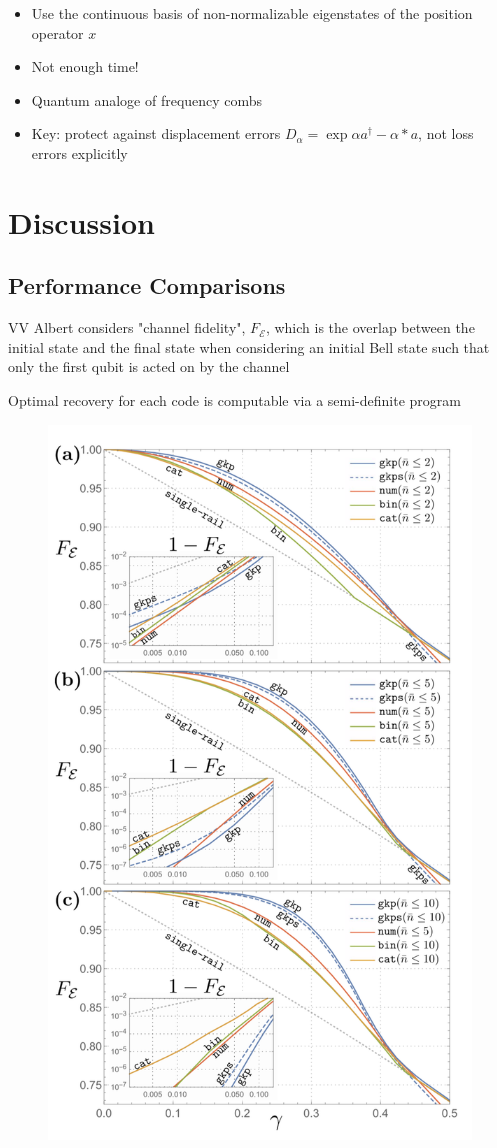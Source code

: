 \documentclass[12]{amsart}
\newcommand\0{\mathbf{0}}
\newcommand\<{\langle}
\renewcommand\>{\rangle}
\begin{document}
\begin{itemize}
\item Use the continuous basis of non-normalizable eigenstates of the position operator $x$	
\item Not enough time!
\item Quantum analoge of frequency combs
\item Key: protect against displacement errors $D_\alpha = \exp{\alpha a^\dag  - \alpha* a}$, not loss errors explicitly
\end{itemize}

\section{Discussion}

\subsection{Performance Comparisons}

VV Albert considers "channel fidelity", $F_\mathcal{E}$, which is the overlap between the initial state and the final state when considering an initial Bell state such that only the first qubit is acted on by the channel

Optimal recovery for each code is computable via a semi-definite program

\begin{figure}[H]
\centering
\includegraphics[width=0.5\linewidth,keepaspectratio]{fidelity.png}	
\end{figure}
\end{document}
